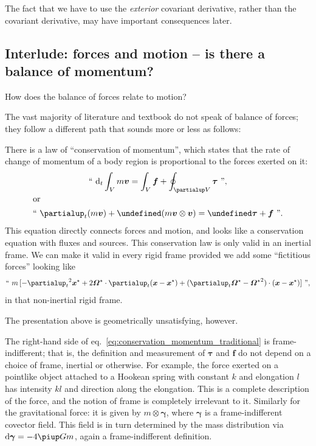 \documentclass[\ifafour a4paper,12pt,\else a5paper,10pt,\fi%
onecolumn,oneside,article,%
british%
]{memoir}
\theoremstyle{remark}
\theoremstyle{innote}
\newcommand*{\de}{\partialup}%
\newcommand*{\pu}{\piup}%
\newcommand*{\di}{\mathrm{d}}%
\renewcommand*{\|}{\nonscript\,\vert\nonscript\;\mathopen{}}
\newcommand*{\eqn}{eq.}%
\let\div\undefined
\DeclareMathOperator{\div}{div}
\newcommand*{\ydd}{m}
\newcommand*{\yd}{\ydd}
\newcommand*{\yTT}{\tau}
\newcommand*{\yT}{\bm{\yTT}}
\newcommand*{\ybb}{f}
\newcommand*{\yb}{\bm{\ybb}}
\newcommand*{\yxxt}{x}
\newcommand*{\yxt}{\bm{\yxxt}}
\newcommand*{\yxto}{\bm{\yxxt}^{\mathord{\star}}}
\newcommand*{\yvvt}{v}
\newcommand*{\yvt}{\bm{\yvvt}}
\newcommand*{\yffg}{\gamma}
\newcommand*{\yfg}{\bm{\yffg}}
\newcommand*{\yomm}{\varOmega}
\newcommand*{\yom}{\bm{\yomm}^{\mathord{\star}}}
\newcommand*{\yvo}{V}
\begin{document}
The fact that we have to use the \emph{exterior} covariant derivative, rather than
the covariant derivative, may have important consequences later.

\subsection{Interlude: forces and motion -- is there a balance of
  momentum?}
\label{sec:really_balance_momentum}

How does the balance of forces relate to motion?

The vast majority of literature and textbook do not speak of balance of
forces; they follow a different path that sounds more or less as follows:

There is a law of \enquote{conservation of momentum}, which states that the
rate of change of momentum of a body region is proportional to the forces
exerted on it:
\begin{subequations}\label{eq:conservation_momentum_traditional}
  \begin{gather}
    \label{eq:conservation_momentum_traditional_integral}
    \text{\textquotedblleft}\ 
    \di_t\int_{\yvo}\yd\yvt = \int_{\yvo} \yb + \oint_{\de\yvo} \yT
    \ \text{\textquotedblright},
    \\\shortintertext{or}
    \label{eq:conservation_momentum_traditional_differential}
    \text{\textquotedblleft}\ 
    \de_t(\yd\yvt) + \div(\yd\yvt\otimes\yvt) = \div\yT +\yb
    \ \text{\textquotedblright}.
  \end{gather}
\end{subequations}
This equation directly connects forces and motion, and looks like a
conservation equation with fluxes and sources. This conservation law is
only valid in an inertial frame. We can make it valid in every rigid frame
provided we add some \enquote{fictitious forces} looking like
\begin{equation}
  \label{eq:fictitious_forces}
    \text{\textquotedblleft}\ 
  \yd\, [-{\de_t}^2\yxto%
  + 2\yom\cdot\de_t(\yxt-\yxto) + (\de_t\yom-{\yom}^2)\cdot(\yxt-\yxto)]
    \ \text{\textquotedblright},
\end{equation}
in that non-inertial rigid frame.

\bigskip

The presentation above is geometrically unsatisfying, however.

The right-hand side of \eqn~\eqref{eq:conservation_momentum_traditional} is
frame-indifferent; that is, the definition and measurement of $\yT$ and
$\yb$ do not depend on a choice of frame, inertial or otherwise. For
example, the force exerted on a pointlike object attached to a Hookean
spring with constant $k$ and elongation $l$ has intensity $kl$ and
direction along the elongation. This is a complete description of the
force, and the notion of frame is completely irrelevant to it. Similarly
for the gravitational force: it is given by $\yd\otimes\yfg$, where $\yfg$
is a frame-indifferent covector field. This field is in turn determined by
the mass distribution via $\di\yfg = - 4\pu G \yd$, again a
frame-indifferent definition.
\end{document}
